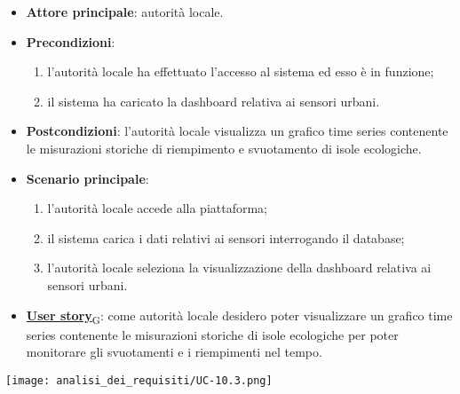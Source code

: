 \begin{itemize}
	\item \textbf{Attore principale}: autorità locale.
	\item \textbf{Precondizioni}:
	      \begin{enumerate}
		      \item l'autorità locale ha effettuato l'accesso al sistema ed esso è in funzione;
		      \item il sistema ha caricato la dashboard relativa ai sensori urbani.
	      \end{enumerate}
	\item \textbf{Postcondizioni}: l'autorità locale visualizza un grafico time series contenente le misurazioni storiche di riempimento e svuotamento
	      di isole ecologiche.
	\item \textbf{Scenario principale}:
	      \begin{enumerate}
		      \item l'autorità locale accede alla piattaforma;
		      \item il sistema carica i dati relativi ai sensori interrogando il database;
		      \item l'autorità locale seleziona la visualizzazione della dashboard relativa ai sensori urbani.
	      \end{enumerate}
	\item \href{https://7last.github.io/docs/rtb/documentazione-interna/glossario\#user-story}{\textbf{User story}\textsubscript{G}}:
	      come autorità locale desidero poter visualizzare un grafico time series contenente le misurazioni storiche
	      di isole ecologiche per poter monitorare gli svuotamenti e i riempimenti nel tempo.
\end{itemize}
\begin{center}
	\texttt{[image: analisi\_dei\_requisiti/UC-10.3.png]}
\end{center}


